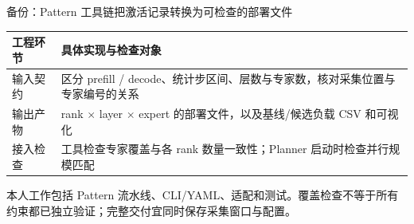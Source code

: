 \documentclass[aspectratio=169,10pt]{beamer}
\newcommand{\src}[1]{\vfill{\fontsize{6.7}{8}\selectfont\color{Muted}#1}\par}
\begin{document}
\begin{frame}{备份：Pattern 工具链把激活记录转换为可检查的部署文件}
\begin{center}
\end{center}
\medskip
\renewcommand{\arraystretch}{1.45}
\begin{tabularx}{\textwidth}{@{}p{2.5cm}Y@{}}
\toprule 工程环节 & 具体实现与检查对象 \\
\midrule
输入契约 & 区分 prefill / decode、统计步区间、层数与专家数，核对采集位置与专家编号的关系 \\
输出产物 & rank $\times$ layer $\times$ expert 的部署文件，以及基线/候选负载 CSV 和可视化 \\
接入检查 & 工具检查专家覆盖与各 rank 数量一致性；Planner 启动时检查并行规模匹配 \\
\bottomrule
\end{tabularx}
\src{本人工作包括 Pattern 流水线、CLI/YAML、适配和测试。覆盖检查不等于所有约束都已独立验证；完整交付宜同时保存采集窗口与配置。}
\end{frame}
\end{document}
